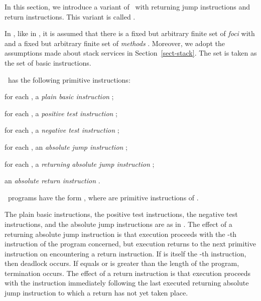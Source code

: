 \documentclass[fleqn]{llncs}
\begin{document}
In this section, we introduce a variant of \PGLD\ with returning jump
instructions and return instructions.
This variant is called \PGLDrj.

In \PGLDrj, like in \PGLDij, it is assumed that there is a fixed but
arbitrary finite set of \emph{foci}  with  and a
fixed but arbitrary finite set of \emph{methods} .
Moreover, we adopt the assumptions made about stack services in
Section~\ref{sect-stack}.
The set  is
taken as the set  of basic instructions.

\PGLDrj\ has the following primitive instructions:
\begin{iteml}
\item
for each , a \emph{plain basic instruction} ;
\item
for each , a \emph{positive test instruction} ;
\item
for each , a \emph{negative test instruction} ;
\item
for each , an \emph{absolute jump instruction} ;
\item
for each ,
a \emph{returning absolute jump instruction} ;
\item
an \emph{absolute return instruction} .
\end{iteml}
\PGLDrj\ programs have the form , where
 are primitive instructions of \PGLDrj.

The plain basic instructions, the positive test instructions, the
negative test instructions, and the absolute jump instructions are as in
\PGLD.
The effect of a returning absolute jump instruction  is that
execution proceeds with the -th instruction of the program concerned,
but execution returns to the next primitive instruction on encountering
a return instruction.
If  is itself the -th instruction, then deadlock occurs.
If  equals  or  is greater than the length of the program,
termination occurs.
The effect of a return instruction  is that execution proceeds
with the instruction immediately following the last executed returning
absolute jump instruction to which a return has not yet taken place.
\end{document}

